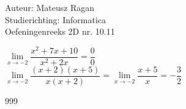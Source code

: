 \documentclass[a4paper]{article}
\begin{document}
\noindent \large Auteur: Mateusz Ragan \\
\noindent \large Studierichting: Informatica\\
\noindent \large Oefeningenreeks 2D nr. 10.11\\

\medskip

\normalsize

$\lim\limits_{x \rightarrow -2} \dfrac{x^2+7x+10}{x^2 +2x} = \dfrac{0}{0}$ \\

$\lim\limits_{x \rightarrow -2} \dfrac{(x+2)(x+5)}{x(x+2)} = \lim\limits_{x \rightarrow -2}\dfrac{x+5}{x} = - \dfrac{3}{2}$

\begin{thebibliography}{999}
\end{thebibliography}
\end{document}
